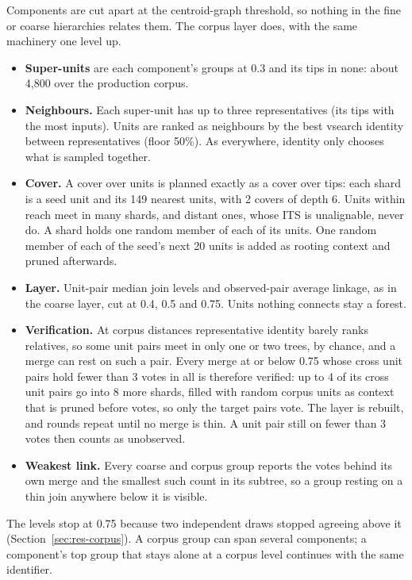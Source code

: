 \documentclass[11pt,a4paper]{article}
\begin{document}
Components are cut apart at the centroid-graph threshold, so nothing in the fine or coarse
hierarchies relates them. The corpus layer does, with the same machinery one level up.
\begin{itemize}
  \item \textbf{Super-units} are each component's groups at 0.3 and its tips in none: about 4,800
        over the production corpus.
  \item \textbf{Neighbours.} Each super-unit has up to three representatives (its tips with the most
        inputs). Units are ranked as neighbours by the best vsearch identity between representatives
        (floor 50\%). As everywhere, identity only chooses what is sampled together.
  \item \textbf{Cover.} A cover over units is planned exactly as a cover over tips: each shard is a
        seed unit and its 149 nearest units, with 2 covers of depth 6. Units within reach meet in
        many shards, and distant ones, whose ITS is unalignable, never do. A shard holds one random
        member of each of its units. One random member of each of the seed's next 20 units is added
        as rooting context and pruned afterwards.
  \item \textbf{Layer.} Unit-pair median join levels and observed-pair average linkage, as in the
        coarse layer, cut at 0.4, 0.5 and 0.75. Units nothing connects stay a forest.
  \item \textbf{Verification.} At corpus distances representative identity barely ranks relatives,
        so some unit pairs meet in only one or two trees, by chance, and a merge can rest on such a
        pair. Every merge at or below 0.75 whose cross unit pairs hold fewer than 3 votes in all is
        therefore verified: up to 4 of its cross unit pairs go into 8 more shards, filled with
        random corpus units as context that is pruned before votes, so only the target pairs vote.
        The layer is rebuilt, and rounds repeat until no merge is thin. A unit pair still on fewer
        than 3 votes then counts as unobserved.
  \item \textbf{Weakest link.} Every coarse and corpus group reports the votes behind its own merge
        and the smallest such count in its subtree, so a group resting on a thin join anywhere
        below it is visible.
\end{itemize}
The levels stop at 0.75 because two independent draws stopped agreeing above it
(Section~\ref{sec:res-corpus}). A corpus group can span several components; a component's top
group that stays alone at a corpus level continues with the same identifier.
\end{document}
